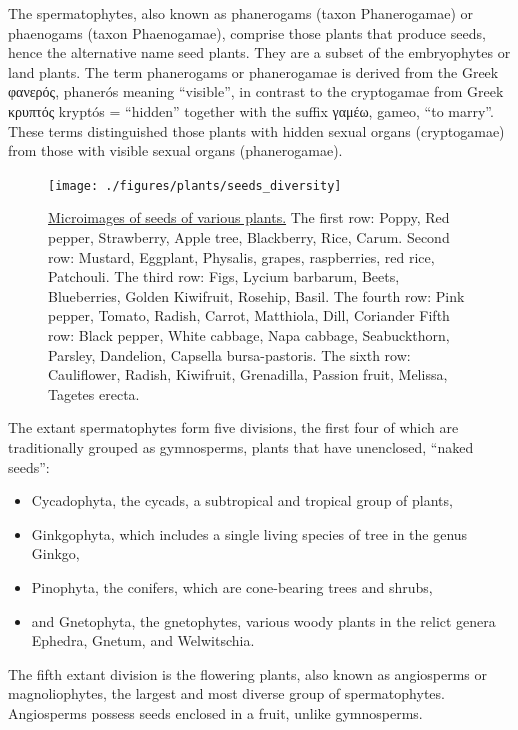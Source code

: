 The spermatophytes, also known as phanerogams (taxon Phanerogamae) or phaenogams (taxon Phaenogamae), comprise those plants that produce seeds, hence the alternative name seed plants. They are a subset of the embryophytes or land plants. The term phanerogams or phanerogamae is derived from the Greek φανερός, phanerós meaning ``visible'', in contrast to the cryptogamae from Greek κρυπτός kryptós = ``hidden'' together with the suffix γαμέω, gameo, ``to marry''. These terms distinguished those plants with hidden sexual organs (cryptogamae) from those with visible sexual organs (phanerogamae).



\begin{figure}

{\centering \texttt{[image: ./figures/plants/seeds\_diversity]} 

}

\caption{\href{https://commons.wikimedia.org/wiki/File:Разнообразие_семян.jpg}{Microimages of seeds of various plants.} The first row: Poppy, Red pepper, Strawberry, Apple tree, Blackberry, Rice, Carum. Second row: Mustard, Eggplant, Physalis, grapes, raspberries, red rice, Patchouli. The third row: Figs, Lycium barbarum, Beets, Blueberries, Golden Kiwifruit, Rosehip, Basil. The fourth row: Pink pepper, Tomato, Radish, Carrot, Matthiola, Dill, Coriander Fifth row: Black pepper, White cabbage, Napa cabbage, Seabuckthorn, Parsley, Dandelion, Capsella bursa-pastoris. The sixth row: Cauliflower, Radish, Kiwifruit, Grenadilla, Passion fruit, Melissa, Tagetes erecta.}\label{fig:seedcollection}
\end{figure}

The extant spermatophytes form five divisions, the first four of which are traditionally grouped as gymnosperms, plants that have unenclosed, ``naked seeds'':

\begin{itemize}
\tightlist
\item
  Cycadophyta, the cycads, a subtropical and tropical group of plants,
\item
  Ginkgophyta, which includes a single living species of tree in the genus Ginkgo,
\item
  Pinophyta, the conifers, which are cone-bearing trees and shrubs,
\item
  and Gnetophyta, the gnetophytes, various woody plants in the relict genera Ephedra, Gnetum, and Welwitschia.
\end{itemize}

The fifth extant division is the flowering plants, also known as angiosperms or magnoliophytes, the largest and most diverse group of spermatophytes. Angiosperms possess seeds enclosed in a fruit, unlike gymnosperms.


